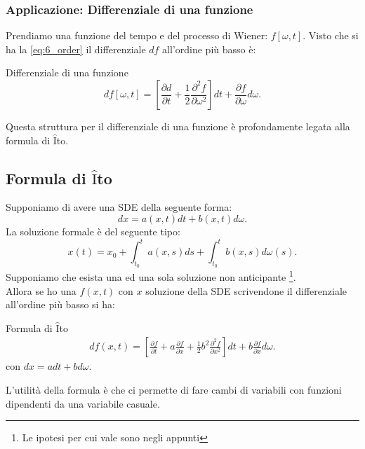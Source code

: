\subsubsection{Applicazione: Differenziale di una funzione}%
\label{subsub:Applicazione: Differenziale di una funzione}
Prendiamo una funzione del tempo e del processo di Wiener: $f\left[\omega,t\right]$. Visto che si ha la \ref{eq:6_order} il differenziale $df$  all'ordine più basso è:
\begin{bluebox}{Differenziale di una funzione}
    \[
	df\left[\omega,t\right] = \left[\frac{\partial d}{\partial t} + \frac{1}{2}\frac{\partial ^2 f}{\partial \omega^2} \right]dt + \frac{\partial f}{\partial \omega} d\omega
    .\] 
\end{bluebox}
\noindent
Questa struttura per il differenziale di una funzione è profondamente legata alla formula di $\hat{\text{I}}$to.
\subsection{Formula di $\hat{\text{I}}$to}%
\label{sub:Formula di ITO}
Supponiamo di avere una SDE della seguente forma:
\[
    dx = a(x,t) dt + b(x,t) d\omega
.\] 
La soluzione formale è del seguente tipo:
\[
    x(t) = x_0 + \int_{t_0}^{t} a(x,s) ds + \int_{t_0}^{t} b(x,s) d\omega (s)   
.\] 
Supponiamo che esista una ed una sola soluzione non anticipante
\footnote{Le ipotesi per cui vale sono negli appunti}. \\
Allora se ho una $f(x,t)$ con $x$ soluzione della SDE scrivendone il differenziale all'ordine più basso si ha:
\begin{redbox}{Formula di $\hat{\text{I}}$to}
    \[\begin{aligned}
	df(x,t) = 
	\left[\frac{\partial f}{\partial t} + 
	a \frac{\partial f}{\partial x} +
        \frac{1}{2}b^2 \frac{\partial ^2 f}{\partial x^2} \right] dt +
	b\frac{\partial f}{\partial x} d\omega 
    .\end{aligned}\]
    con $dx = adt + bd\omega$.
\end{redbox}
\noindent
L'utilità della formula è che ci permette di fare cambi di variabili con funzioni dipendenti da una variabile casuale.
\clearpage
